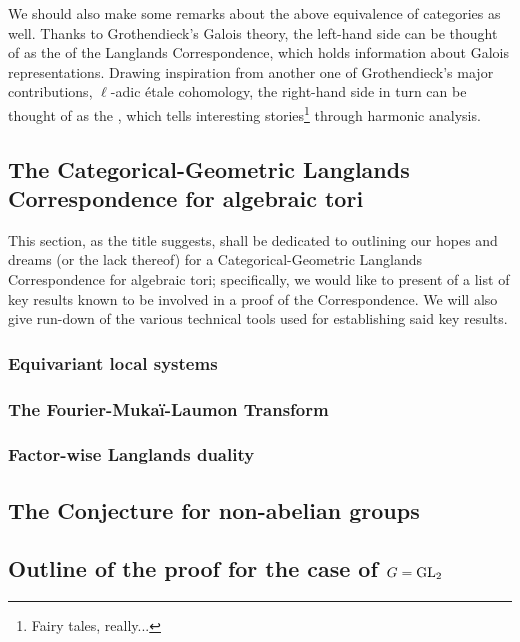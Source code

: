         
        We should also make some remarks about the above equivalence of categories as well. Thanks to Grothendieck's Galois theory, the left-hand side can be thought of as the  of the Langlands Correspondence, which holds information about Galois representations. Drawing inspiration from another one of Grothendieck's major contributions, $\ell$-adic \'etale cohomology, the right-hand side in turn can be thought of as the , which tells interesting stories\footnote{Fairy tales, really...} through harmonic analysis.
    
        \subsection{The Categorical-Geometric Langlands Correspondence for algebraic tori}
            This section, as the title suggests, shall be dedicated to outlining our hopes and dreams (or the lack thereof) for a Categorical-Geometric Langlands Correspondence for algebraic tori; specifically, we would like to present of a list of key results known to be involved in a proof of the Correspondence. We will also give run-down of the various technical tools used for establishing said key results. 
            
            \subsubsection{Equivariant local systems}
        
            \subsubsection{The Fourier-Muka\"i-Laumon Transform}
            
            \subsubsection{Factor-wise Langlands duality}
            
        \subsection{The Conjecture for non-abelian groups}
        
        \subsection{Outline of the proof for the case of \texorpdfstring{$G = \operatorname{GL}_2$}{}}
        
